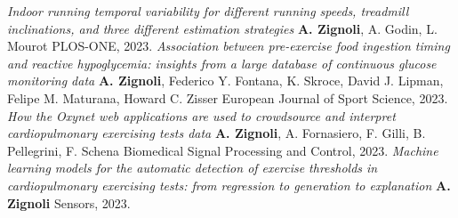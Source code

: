 \documentclass[helvetica,openbib,logo,notitle,flagCMYK,totpages]{europecv}
\begin{document}
\begin{europecv}
{	\emph{Indoor running temporal variability for different running speeds, treadmill inclinations, and three different estimation strategies}\newline 
	\textbf{A. Zignoli}, A. Godin, L. Mourot
    \newline 
    PLOS-ONE, 2023. 
 \newline
	\newline
	\emph{Association between pre-exercise food ingestion timing and reactive hypoglycemia: insights from a large database of continuous glucose monitoring data}\newline 
	\textbf{A. Zignoli}, Federico Y. Fontana, K. Skroce, David J. Lipman, Felipe M. Maturana, Howard C. Zisser
    \newline 
    European Journal of Sport Science, 2023. 
 \newline
	\newline
	\emph{How the Oxynet web applications are used to crowdsource and interpret cardiopulmonary exercising tests data}\newline 
	\textbf{A. Zignoli}, A. Fornasiero, F. Gilli, B. Pellegrini, F. Schena
    \newline 
    Biomedical Signal Processing and Control, 2023. 
 \newline
	\newline
	\emph{Machine learning models for the automatic detection of exercise thresholds in cardiopulmonary exercising tests: from regression to generation to explanation}\newline 
	\textbf{A. Zignoli}
    \newline 
    Sensors, 2023. 
 \newline
	\newline
}

\newpage
{}
\ecvitem{}{


}
\end{europecv}
\end{document}
